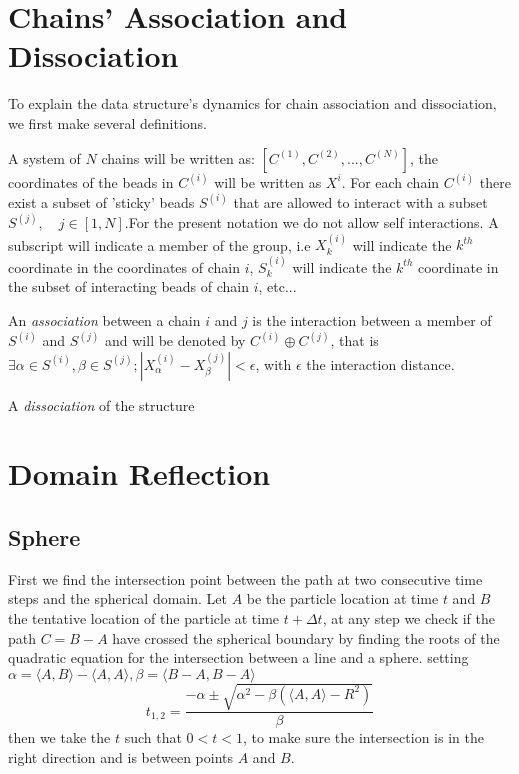 \documentclass[12pt]{report}
\begin{document}
\section{Chains' Association and Dissociation} 
To explain the data structure's dynamics for chain association and dissociation, we first make several definitions.

A system of $N$ chains will be written as:  $[C^{(1)},C^{(2)},...,C^{(N)} ]$, the coordinates of the beads in $C^{(i)}$ will be written as $X^{i}$. For each chain $C^{(i)}$ there exist a subset of 'sticky' beads $S^{(i)}$ that are allowed to interact with a subset $S^{(j)},\quad j\in [1,N]$.For the present notation we do not allow self interactions. A subscript will indicate a member of the group, i.e $X^{(i)}_k$ will indicate the $k^{th}$ coordinate in the coordinates of chain $i$, $S^{(i)}_k$ will indicate the $k^{th}$ coordinate in the subset of interacting beads of chain $i$, etc... 

An \textit{association} between a chain $i$ and $j$ is the interaction between a member of $S^{(i)}$ and $S^{(j)}$ and will be denoted by  
$C^{(i)}\oplus C^{(j)}$, that is $\exists \alpha \in S^{(i)},\beta \in S^{(j)}; |X^{(i)}_\alpha-X^{(j)}_\beta |<\epsilon$, with $\epsilon$ the interaction distance.

A \textit{dissociation} of the structure 
 

\section{Domain Reflection}
\subsection{Sphere}
First we find the intersection point between the path at two consecutive time steps and the spherical domain. Let $A$ be the particle location at time $t$ and $B$ the tentative location of the particle at time $t+\Delta t$, at any step we check if the path $C=B-A$ have crossed the spherical boundary by finding the roots of the quadratic equation for the intersection between a line and a sphere. setting $\alpha= \langle A,B \rangle -\langle A,A \rangle , \beta = \langle B-A,B-A \rangle$
\begin{equation*}
t_{1,2}=\frac{-\alpha \pm \sqrt{\alpha^2-\beta (\langle A,A \rangle -R^2)}}{\beta}
\end{equation*}
then we take the $t$ such that $0<t<1$, to make sure the intersection is in the right direction and is between points $A$ and $B$.
\end{document}
